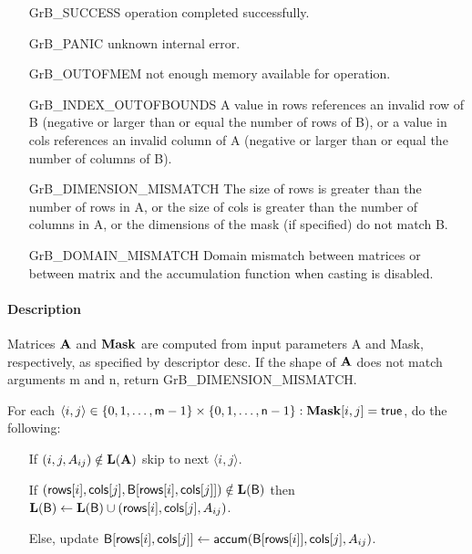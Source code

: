 \begin{itemize}[leftmargin=2.1in]
\item[{\sf GrB\_SUCCESS}]      operation completed successfully.
\item[{\sf GrB\_PANIC}]        unknown internal error.
\item[{\sf GrB\_OUTOFMEM}]     not enough memory available for operation.
\item[{\sf GrB\_INDEX\_OUTOFBOUNDS}]
        A value in {\sf rows} references an invalid row of {\sf B} (negative or larger than or equal the number of rows of {\sf B}),
        or a value in {\sf cols} references an invalid column of {\sf A} (negative or larger than or equal the number of columns of {\sf B}).
\item[{\sf GrB\_DIMENSION\_MISMATCH}] 
        The size of {\sf rows} is greater than the number of rows in {\sf A}, or
        the size of {\sf cols} is greater than the number of columns in {\sf A}, or
        the dimensions of the mask (if specified) do not match {\sf B}.
\item[\sf GrB\_DOMAIN\_MISMATCH]  
       Domain mismatch between matrices or between matrix and the accumulation function when casting is disabled.
\end{itemize}

\paragraph{Description}

Matrices ${\bf A}$ and ${\bf Mask}$ are computed from input parameters {\sf A} and {\sf Mask}, respectively,
as specified by descriptor {\sf desc}. If the shape of ${\bf A}$ does not match arguments {\sf m} and {\sf n},
return {\sf GrB\_DIMENSION\_MISMATCH}.

For each $\langle i,j \rangle \in \{0, 1, \ldots, {\sf m}-1 \} \times \{0, 1, \ldots, {\sf n}-1 \} : {\bf Mask}[i,j] = {\sf true}$, do the following:
\begin{itemize}
	\item[] If $(i,j,A_{ij}) \notin \bold{L}({\bf A})$ skip to next $\langle i,j \rangle$.
	\item[] If $({\sf rows}[i], {\sf cols}[j], {\sf B}[{\sf rows}[i],{\sf cols}[j]]) \notin \bold{L}({\sf B})$ then
	      $\bold{L}({\sf B}) \leftarrow \bold{L}({\sf B}) \cup ({\sf rows}[i],{\sf cols}[j],A_{ij})$.
	\item[]  Else, update ${\sf B}[{\sf rows}[i],{\sf cols}[j]] \leftarrow {\sf accum}({\sf B}[{\sf rows}[i]],{\sf cols}[j],A_{ij})$.
\end{itemize}

